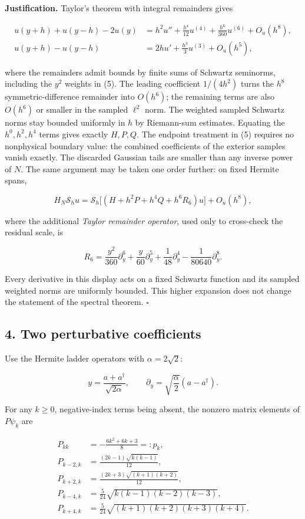 \documentclass[
  10pt,
  a4paper,
]{article}
\begin{document}
\textbf{Justification.} Taylor's theorem with integral remainders gives

\[
\begin{aligned}
u(y+h)+u(y-h)-2u(y)
&=h^2u''+\tfrac{h^4}{12}u^{(4)}+\tfrac{h^6}{360}u^{(6)}+O_u(h^8),\\
u(y+h)-u(y-h)
&=2hu'+\tfrac{h^3}{3}u^{(3)}+O_u(h^5),
\end{aligned}
\]

where the remainders admit bounds by finite sums of Schwartz seminorms, including the \(y^2\) weights in (5). The leading coefficient \(1/(4h^2)\) turns the \(h^8\) symmetric-difference remainder into \(O(h^6)\); the remaining terms are also \(O(h^6)\) or smaller in the sampled \(\ell^2\) norm. The weighted sampled Schwartz norms stay bounded uniformly in \(h\) by Riemann-sum estimates. Equating the \(h^0,h^2,h^4\) terms gives exactly \(H,P,Q\). The endpoint treatment in (5) requires no nonphysical boundary value: the combined coefficients of the exterior samples vanish exactly. The discarded Gaussian tails are smaller than any inverse power of \(N\). The same argument may be taken one order further: on fixed Hermite spans,

\[
H_N\mathcal S_hu=\mathcal S_h\big[(H+h^2P+h^4Q+h^6R_6)u\big]+O_u(h^8),
\]

where the additional \emph{Taylor remainder operator}, used only to cross-check the residual scale, is

\[
R_6=\frac{y^2}{360}\partial_y^6+\frac{y}{60}\partial_y^5
+\frac1{48}\partial_y^4-\frac1{80640}\partial_y^8.
\]

Every derivative in this display acts on a fixed Schwartz function and its sampled weighted norms are uniformly bounded. This higher expansion does not change the statement of the spectral theorem. \(\square\)

\subsection{4. Two perturbative coefficients}\label{two-perturbative-coefficients}

Use the Hermite ladder operators with \(\alpha=2\sqrt2\):

\[
y=\frac{a+a^\dagger}{\sqrt{2\alpha}},\qquad
\partial_y=\sqrt{\frac\alpha2}(a-a^\dagger).
\]

For any \(k\ge0\), negative-index terms being absent, the nonzero matrix elements of \(P\psi_k\) are

\[
\begin{aligned}
P_{kk}&=-\frac{6k^2+6k+3}{8}=:p_k,\\
P_{k-2,k}&=\frac{(2k-1)\sqrt{k(k-1)}}{12},\\
P_{k+2,k}&=\frac{(2k+3)\sqrt{(k+1)(k+2)}}{12},\\
P_{k-4,k}&=\frac5{24}\sqrt{k(k-1)(k-2)(k-3)},\\
P_{k+4,k}&=\frac5{24}\sqrt{(k+1)(k+2)(k+3)(k+4)}.
\end{aligned}\tag{8}
\]
\end{document}

